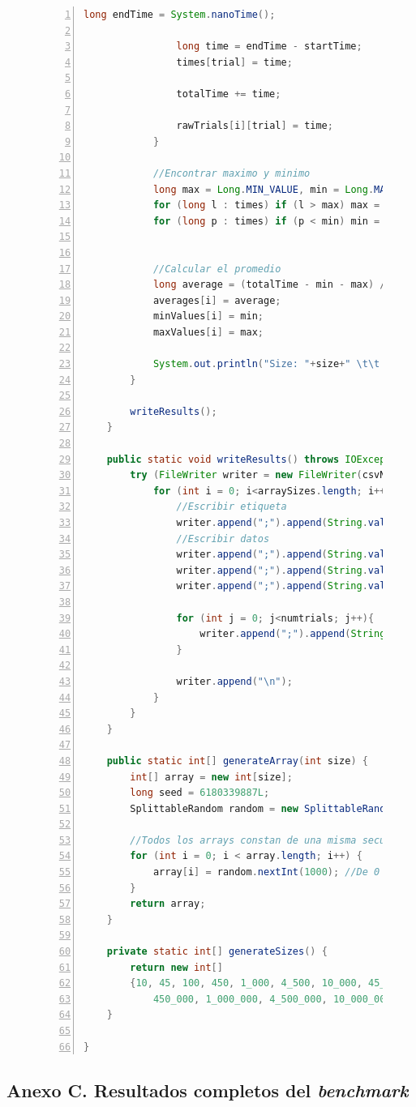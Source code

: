 \documentclass[titlepage]{article}
\begin{document}
\begin{figure}[h]
\begin{lstlisting}[language=java, frame=single, numbers=left]
				long endTime = System.nanoTime();
				
				long time = endTime - startTime;
				times[trial] = time;
				
				totalTime += time;
				
				rawTrials[i][trial] = time;
			}
			
			//Encontrar maximo y minimo
			long max = Long.MIN_VALUE, min = Long.MAX_VALUE;
			for (long l : times) if (l > max) max = l;
			for (long p : times) if (p < min) min = p;
			
			
			//Calcular el promedio
			long average = (totalTime - min - max) / (numtrials - 2);
			averages[i] = average;
			minValues[i] = min;
			maxValues[i] = max;
			
			System.out.println("Size: "+size+" \t\t Time: "+average);
		}
		
		writeResults();
	}
	
	public static void writeResults() throws IOException {
		try (FileWriter writer = new FileWriter(csvName)) {
			for (int i = 0; i<arraySizes.length; i++) {
				//Escribir etiqueta
				writer.append(";").append(String.valueOf(arraySizes[i]));
				//Escribir datos
				writer.append(";").append(String.valueOf(averages[i]));
				writer.append(";").append(String.valueOf(minValues[i]));
				writer.append(";").append(String.valueOf(maxValues[i]));
				
				for (int j = 0; j<numtrials; j++){
					writer.append(";").append(String.valueOf(rawTrials[i][j]));
				}
				
				writer.append("\n");
			}
		}
	}
	
	public static int[] generateArray(int size) {
		int[] array = new int[size];
		long seed = 6180339887L;
		SplittableRandom random = new SplittableRandom(seed);
		
		//Todos los arrays constan de una misma secuencia
		for (int i = 0; i < array.length; i++) {
			array[i] = random.nextInt(1000); //De 0 a 999
		}
		return array;
	}
	
	private static int[] generateSizes() {
		return new int[]
		{10, 45, 100, 450, 1_000, 4_500, 10_000, 45_000, 100_000,
			450_000, 1_000_000, 4_500_000, 10_000_000, 45_000_000, 100_000_000};
	}
	
}
	\end{lstlisting}
\end{figure}

\subsection{Anexo C. Resultados completos del \textit{benchmark}}
\end{document}
